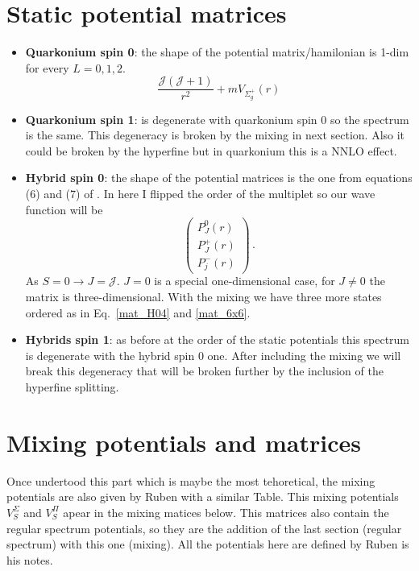 \documentclass[11pt, a4paper]{article}
\begin{document}
\section{Static potential matrices}
\begin{itemize}
    \item \textbf{Quarkonium spin 0}: the shape of the potential matrix/hamilonian is 1-dim for every $L=0,1,2$. 
    \begin{equation}
    \label{eq:QS0}
    \frac{\mathcal{J}(\mathcal{J}+1)}{r^2} + m V_{\Sigma_g^+}(r) 
    \end{equation}
%
    \item \textbf{Quarkonium spin 1}: is degenerate with quarkonium spin 0 so the spectrum is the same. This degeneracy is broken by the mixing in next section. Also it could be broken by the hyperfine but in quarkonium this is a NNLO effect.
    \item \textbf{Hybrid spin 0}: the shape of the potential matrices is the one from equations (6) and (7) of \cite{Oncala:2017hop}. In here I flipped the order of the multiplet so our wave function will be
    \[
    \begin{pmatrix}
        P_J^0(r) \\
        P_J^+(r) \\
        P_j^-(r) 
    \end{pmatrix} \, .
    \]
    As $S=0 \to J=\mathcal{J}$. $J=0$ is a special one-dimensional case, for $J \neq 0$ the matrix is three-dimensional. With the mixing we have three more states ordered as in Eq.~\eqref{mat_H04} and \eqref{mat_6x6}.
    \item \textbf{Hybrids spin 1}: as before at the order of the static potentials this spectrum is degenerate with the hybrid spin 0 one. After including the mixing we will break this degeneracy that will be broken further by the inclusion of the hyperfine splitting.
\end{itemize}

\section{Mixing potentials and matrices}
Once undertood this part which is maybe the most tehoretical, the mixing potentials are also given by Ruben with a similar Table. This mixing potentials $V_S^\Sigma$ and $V_S^\Pi$ apear in the mixing matices below. This matrices also contain the regular spectrum potentials, so they are the addition of the last section (regular spectrum) with this one (mixing). All the potentials here are defined by Ruben is his notes.
\end{document}
